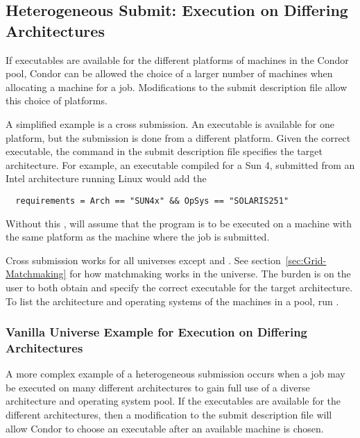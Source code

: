 \subsection{Heterogeneous Submit: Execution on Differing Architectures} 

If executables are available for the different platforms of machines
in the Condor pool,
Condor can be allowed the choice of a larger number of machines
when allocating a machine for a job.
Modifications to the submit description file allow this choice
of platforms.

A simplified example is a cross submission.
An executable is available for one platform, but
the submission is done from a different platform.
Given the correct executable, the  command in
the submit description file specifies the target architecture.
For example, an executable compiled for a Sun 4, submitted
from an Intel architecture running Linux would add the 
\begin{verbatim}
  requirements = Arch == "SUN4x" && OpSys == "SOLARIS251"
\end{verbatim}
Without this , 
will assume that the program is to be executed on
a machine with the same platform as the machine where the job
is submitted.

Cross submission works for all universes except  and
.
See section~\ref{sec:Grid-Matchmaking} for how matchmaking works in the
 universe.
The burden is on the user to both obtain and specify
the correct executable for the target architecture.
To list the architecture and operating systems of the machines
in a pool, run .

\subsubsection{Vanilla Universe Example for Execution on Differing Architectures} 

A more complex example of a heterogeneous submission
occurs when a job may be executed on
many different architectures to gain full
use of a diverse architecture and operating system pool.
If the executables are available for the different architectures,
then a modification to the submit description file
will allow Condor to choose an executable after an
available machine is chosen.

